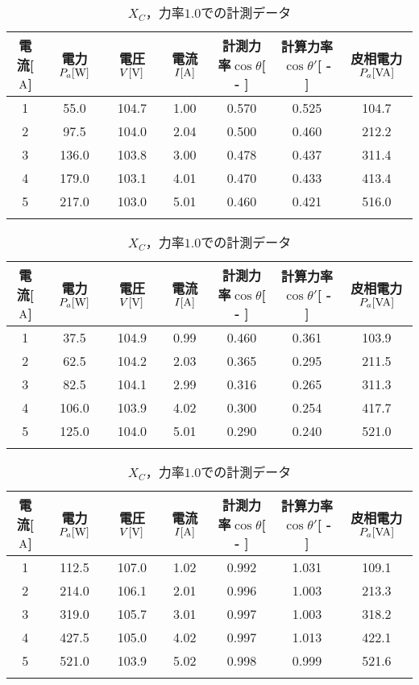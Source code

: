 \begin{table}[h]
	\caption{$X_{L}$，力率$0.4$での計測データ}
	\label{tab:0.4data}
\begin{tabular}{ccccccc}
	\hline
	電流[$\rm{A}$] & 電力$P_a[\rm{W}]$ & 電圧$V[\rm{V}]$ & 電流$I[\rm{A}]$ & 計測力率$\cos \theta$[ - ] & 計算力率$\cos \theta '$[ - ] & 皮相電力$P_a[\rm{VA}]$ \\ \hline
	1 & 55.0  & 104.7 & 1.00 & 0.570 & 0.525 & 104.7 \\
	2 & 97.5  & 104.0 & 2.04 & 0.500 & 0.460 & 212.2 \\
	3 & 136.0 & 103.8 & 3.00 & 0.478 & 0.437 & 311.4 \\
	4 & 179.0 & 103.1 & 4.01 & 0.470 & 0.433 & 413.4 \\
	5 & 217.0 & 103.0 & 5.01 & 0.460 & 0.421 & 516.0 \\ \hline\\
\end{tabular}
	\caption{$X_{L}$，力率$0.2$での計測データ}
	\label{tab:0.2data}
\begin{tabular}{ccccccc}
	\hline
	電流[$\rm{A}$] & 電力$P_a[\rm{W}]$ & 電圧$V[\rm{V}]$ & 電流$I[\rm{A}]$ & 計測力率$\cos \theta$[ - ] & 計算力率$\cos \theta '$[ - ] & 皮相電力$P_a[\rm{VA}]$ \\ \hline
	1 & 37.5  & 104.9 & 0.99 & 0.460 & 0.361 & 103.9 \\
	2 & 62.5  & 104.2 & 2.03 & 0.365 & 0.295 & 211.5 \\
	3 & 82.5  & 104.1 & 2.99 & 0.316 & 0.265 & 311.3 \\
	4 & 106.0 & 103.9 & 4.02 & 0.300 & 0.254 & 417.7 \\
	5 & 125.0 & 104.0 & 5.01 & 0.290 & 0.240 & 521.0 \\ \hline\\
\end{tabular}
	\caption{$X_{C}$，力率$1.0$での計測データ}
	\label{tab:1data2}
\begin{tabular}{ccccccc}
	\hline
	電流[$\rm{A}$] & 電力$P_a[\rm{W}]$ & 電圧$V[\rm{V}]$ & 電流$I[\rm{A}]$ & 計測力率$\cos \theta$[ - ] & 計算力率$\cos \theta '$[ - ] & 皮相電力$P_a[\rm{VA}]$ \\ \hline
	1 & 112.5 & 107.0 & 1.02 & 0.992 & 1.031 & 109.1 \\
	2 & 214.0 & 106.1 & 2.01 & 0.996 & 1.003 & 213.3 \\
	3 & 319.0 & 105.7 & 3.01 & 0.997 & 1.003 & 318.2 \\
	4 & 427.5 & 105.0 & 4.02 & 0.997 & 1.013 & 422.1 \\
	5 & 521.0 & 103.9 & 5.02 & 0.998 & 0.999 & 521.6 \\ \hline\\

\end{tabular}
\end{table}
